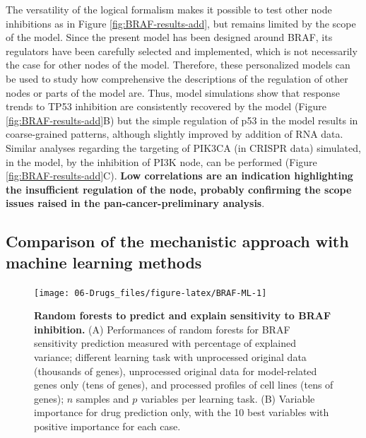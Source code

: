 \documentclass[a4paper,12pt,twoside,onecolumn,openright,final,oldfontcommands]{memoir}
\begin{document}
The versatility of the logical formalism makes it possible to test other
node inhibitions as in Figure \ref{fig:BRAF-results-add}, but remains
limited by the scope of the model. Since the present model has been
designed around BRAF, its regulators have been carefully selected and
implemented, which is not necessarily the case for other nodes of the
model. Therefore, these personalized models can be used to study how
comprehensive the descriptions of the regulation of other nodes or parts
of the model are. Thus, model simulations show that response trends to
TP53 inhibition are consistently recovered by the model (Figure
\ref{fig:BRAF-results-add}B) but the simple regulation of p53 in the
model results in coarse-grained patterns, although slightly improved by
addition of RNA data. Similar analyses regarding the targeting of PIK3CA
(in CRISPR data) simulated, in the model, by the inhibition of PI3K
node, can be performed (Figure \ref{fig:BRAF-results-add}C). \textbf{Low
correlations are an indication highlighting the insufficient regulation
of the node, probably confirming the scope issues raised in the
pan-cancer-preliminary analysis}.

\subsection{Comparison of the mechanistic approach with machine learning
methods}\label{comparison-of-the-mechanistic-approach-with-machine-learning-methods}

\begin{figure}

{\centering \texttt{[image: 06-Drugs\_files/figure-latex/BRAF-ML-1]} 

}

\caption[Application of personalized models to other CRISPR targets]{\textbf{Random forests to predict and explain
sensitivity to BRAF inhibition.} (A) Performances of random forests for
BRAF sensitivity prediction measured with percentage of explained
variance; different learning task with unprocessed original data
(thousands of genes), unprocessed original data for model-related genes
only (tens of genes), and processed profiles of cell lines (tens of
genes); \(n\) samples and \(p\) variables per learning task. (B)
Variable importance for drug prediction only, with the 10 best variables
with positive importance for each case.}\label{fig:BRAF-ML}
\end{figure}
\end{document}
